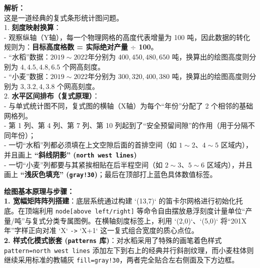 \documentclass[12pt, a4paper]{ctexrep}
\begin{document}
\begin{center}
\end{center}

\vspace{0.8cm}

{\small\color{gray}
\textbf{解析：}\\
这是一道经典的复式条形统计图问题。\\
1. \textbf{刻度映射换算}：\\
- 观察纵轴（Y轴），每一个物理网格的高度代表增量为 100 吨，因此数据的转化规则为：\textbf{目标高度格数 = 实际绝对产量 $\div$ 100}。\\
- “水稻”数据：$2019\sim 2022$年分别为 $400, 450, 480, 650$ 吨，换算出的绘图高度则分别为 $4, 4.5, 4.8, 6.5$ 个网高刻度。\\
- “小麦”数据：$2019\sim 2022$年分别为 $300, 320, 400, 380$ 吨，换算出的绘图高度则分别为 $3, 3.2, 4, 3.8$ 个网高刻度。\\
2. \textbf{水平区间排布（复式原理）}：\\
- 与单式统计图不同，复式图的横轴（X轴）为每个“年份”分配了 2 个相邻的基础网格列。\\
- 第 1 列、第 4 列、第 7 列、第 10 列起到了“安全预留间隙”的作用（用于分隔不同年份）；\\
- 一切“水稻”列都必须填在上文空隙后面的首排空间（如 $1\sim2$、$4\sim5$ 区域内），并且画上 \textbf{“斜线阴影” (\texttt{north west lines})}\\
- 一切“小麦”列都要与其紧挨相贴在后半程空间（如 $2\sim3$、$5\sim6$ 区域内），并且画上 \textbf{“浅灰色填充” (\texttt{gray!30})}；最后在顶部打上蓝色具体数值标签。
}

\vspace{0.6cm}

{\small\color{blue!70!black}
\textbf{绘图基本原理与步骤：}\\
\textbf{1. 宽幅矩阵阵列搭建}：底层系统通过构建 `(13,7)` 的笛卡尔网格进行初始化托底。在顶端利用 \texttt{node[above left/right]} 等命令自由摆放悬浮刻度计量单位“产量/吨”与复式分类专属图例。在横轴刻度标签上，利用 `(2,0)`、`(5,0)` 将“201X年”字样正向对准 `X` \texttt{->} `X+1` 这一复式组合宽度的质心点位。\\
\textbf{2. 样式化模式嵌套 (\texttt{patterns} 库)}：对水稻采用了特殊的画笔着色样式 \texttt{pattern=north west lines} 添加左下到右上的经典并行斜剖纹理，而小麦柱体则继续采用标准的教辅灰 \texttt{fill=gray!30}，两者完全贴合左右侧面及下方边框。
}
\end{document}
